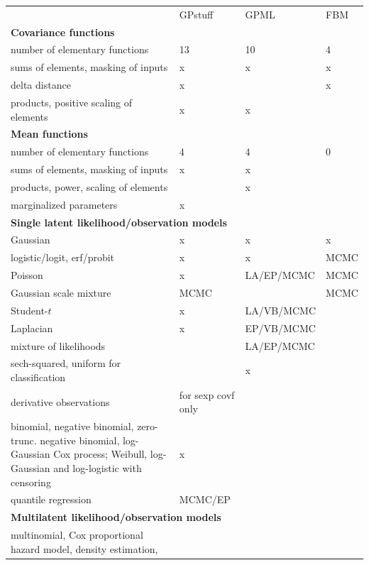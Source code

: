 \documentclass[twoside,11pt]{article}
\begin{document}
\begin{table}
  \scriptsize
  \begin{tabular}{p{9.5cm}p{2.3cm}p{2.1cm}p{0.9cm}}
    & GPstuff & GPML & FBM \\
    \textbf{Covariance functions} &  &  & \\
    \hline
    number of elementary functions & 13 & 10 & 4 \\
    sums of elements, masking of inputs  & x & x & x \\
    delta distance & x & & x \\
    products, positive scaling of elements & x & x &  \\    
    \multicolumn{4}{l}{\textbf{Mean functions}} \\
    \hline
    number of elementary functions & 4 & 4 & 0 \\
    sums of elements, masking of inputs & x & x & \\
    products, power, scaling of elements &  & x &  \\
    marginalized parameters  & x &  &  \\
    \multicolumn{4}{l}{\textbf{Single latent likelihood/observation models}}  \\
    \hline
    Gaussian & x & x & x \\
    logistic/logit, erf/probit & x & x & MCMC\\
    Poisson & x & LA/EP/MCMC & MCMC \\
    Gaussian scale mixture & MCMC &  & MCMC\\
    Student-$t$ & x & LA/VB/MCMC & \\
    Laplacian & x & EP/VB/MCMC & \\
    mixture of likelihoods &   &  LA/EP/MCMC  & \\
    sech-squared, uniform for classification &  & x & \\
    derivative observations & for sexp covf only &  & \\
    \hangindent=0.3cm binomial, negative binomial, zero-trunc. negative binomial, 
    log-Gaussian Cox process; Weibull, log-Gaussian and log-logistic with censoring & x &  & \\
    quantile regression & MCMC/EP & & \\
    \multicolumn{4}{l}{\textbf{Multilatent likelihood/observation models}} \\
    \hline
    \hangindent=0.3cm multinomial, Cox proportional hazard model, density estimation,

\end{tabular}
\end{table}
\end{document}
